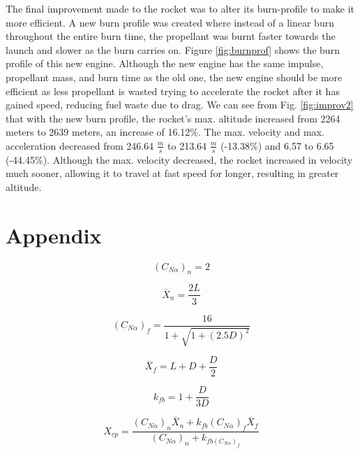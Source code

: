 \documentclass{report}
\begin{document}
\noindent The final improvement made to the rocket was to alter its burn-profile to make it more efficient.
A new burn profile was created where instead of a linear burn throughout the entire burn time, the propellant was burnt faster towards the launch and slower as the burn carries on.
Figure \ref{fig:burnprof} shows the burn profile of this new engine.
Although the new engine has the same impulse, propellant mass, and burn time as the old one, the new engine should be more efficient as less propellant is wasted trying to accelerate the rocket after it has gained speed, reducing fuel waste due to drag.
We can see from Fig. \ref{fig:improv2} that with the new burn profile, the rocket's max. altitude increased from 2264 meters to 2639 meters, an increase of 16.12\%.
The max. velocity and max. acceleration decreased from 246.64 $\frac{m}{s}$ to 213.64 $\frac{m}{s}$ (-13.38\%) and 6.57 to 6.65 (-44.45\%).
Although the max. velocity decreased, the rocket increased in velocity much sooner, allowing it to travel at fast speed for longer, resulting in greater altitude. 




\newpage
\section*{Appendix}

\begin{equation}
    (C_{N\alpha})_n=2
\end{equation}

\begin{equation}
    \bar{X}_n = \frac{2L}{3}
\end{equation}

\begin{equation}
    (C_{N\alpha})_f = \frac{16}{1+\sqrt{1+(2.5D)^2}}
\end{equation}

\begin{equation}
    \bar{X}_f = L+D+\frac{D}{2}
\end{equation}

\begin{equation}
    k_{fb} = 1 + \frac{D}{3D}
\end{equation}

\begin{equation}
    X_{cp} = \frac{(C_{N\alpha})_n\bar{X}_n + k_{fb}(C_{N\alpha})_f\bar{X}_f}{(C_{N\alpha})_n+k_{fb(C_{N\alpha})_f}}
\end{equation}
\end{document}

